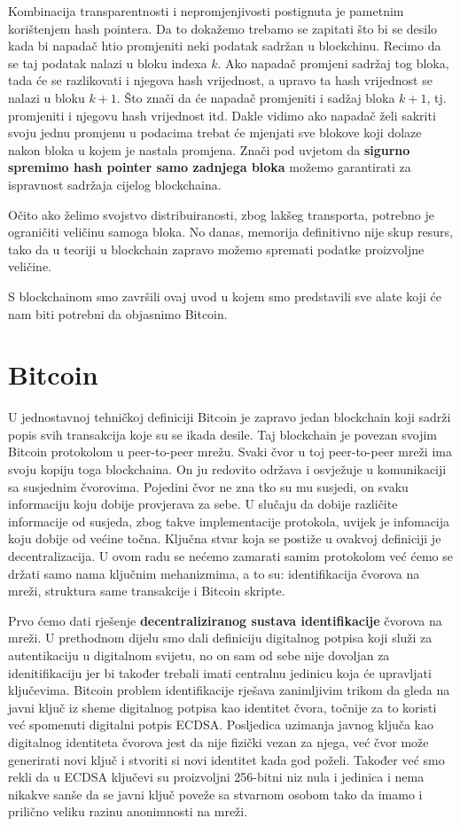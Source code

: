 \documentclass[12pt]{report}
\begin{document}
Kombinacija transparentnosti i nepromjenjivosti postignuta je pametnim korištenjem hash pointera. Da to dokažemo trebamo se zapitati što bi se desilo kada bi napadač htio promjeniti neki podatak sadržan u blockchinu. Recimo da se taj podatak nalazi u bloku indexa $k$. Ako napadač promjeni sadržaj tog bloka, tada će se razlikovati i njegova hash vrijednost, a upravo ta hash vrijednost se nalazi u bloku $k+1$. Što znači da će napadač promjeniti i sadžaj bloka $k+1$, tj. promjeniti i njegovu hash vrijednost itd. Dakle vidimo ako napadač želi sakriti svoju jednu promjenu u podacima trebat će mjenjati sve blokove koji dolaze nakon bloka u kojem je nastala promjena. Znači pod uvjetom da \textbf{sigurno spremimo hash pointer samo zadnjega bloka} možemo garantirati za ispravnost sadržaja cijelog blockchaina. 

Očito ako želimo svojstvo distribuiranosti, zbog lakšeg transporta, potrebno je ograničiti veličinu samoga bloka. No danas, memorija definitivno nije skup resurs, tako da u teoriji u blockchain zapravo možemo spremati podatke proizvoljne veličine.

S blockchainom smo završili ovaj uvod u kojem smo predstavili sve alate koji će nam biti potrebni da objasnimo Bitcoin.

\section{Bitcoin}

U jednostavnoj tehničkoj definiciji Bitcoin je zapravo jedan blockchain koji sadrži popis svih transakcija koje su se ikada desile. Taj blockchain je povezan svojim Bitcoin protokolom u peer-to-peer mrežu. Svaki čvor u toj peer-to-peer mreži ima svoju kopiju toga blockchaina. On ju redovito održava i osvježuje u komunikaciji sa susjednim čvorovima. Pojedini čvor ne zna tko su mu susjedi, on svaku informaciju koju dobije provjerava za sebe. U slučaju da dobije različite informacije od susjeda, zbog takve implementacije protokola, uvijek je infomacija koju dobije od većine točna. Ključna stvar koja se postiže u ovakvoj definiciji je decentralizacija. U ovom radu se nećemo zamarati samim protokolom već ćemo se držati samo nama ključnim mehanizmima, a to su: identifikacija čvorova na mreži, struktura same transakcije i Bitcoin skripte.

Prvo ćemo dati rješenje \textbf{decentraliziranog sustava identifikacije} čvorova na mreži. U prethodnom dijelu smo dali definiciju digitalnog potpisa koji služi za autentikaciju u digitalnom svijetu, no on sam od sebe nije dovoljan za idenitifikaciju jer bi također trebali imati centralnu jedinicu koja će upravljati ključevima. Bitcoin problem identifikacije rješava zanimljivim trikom da gleda na javni ključ iz sheme digitalnog potpisa kao identitet čvora, točnije za to koristi već spomenuti digitalni potpis ECDSA. Posljedica uzimanja javnog ključa kao digitalnog identiteta čvorova jest da nije fizički vezan za njega, već čvor može generirati novi ključ i stvoriti si novi identitet kada god poželi. Također već smo rekli da u ECDSA ključevi su proizvoljni 256-bitni niz nula i jedinica i nema nikakve sanše da se javni ključ poveže sa stvarnom osobom tako da imamo i prilično veliku razinu anonimnosti na mreži.
\end{document}
